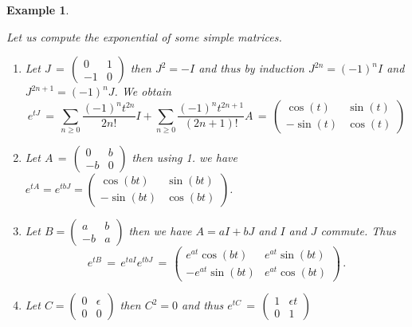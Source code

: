 \documentclass[12pt]{report}
\newtheorem{example}[theorem]{Example}
\begin{document}
\begin{example}\label{exexp}
{\rm Let us compute the exponential of some simple matrices. 

\begin{enumerate}
\item Let $J\,=\, \left( \begin{array}{cc} 0 & 1 \\ -1 & 0 \end{array} \right)$ then $J^2= -I$ and thus by induction $J^{2n}= (-1)^n I$ and $ J^{2n+1} = (-1)^{n} J$. We obtain
\begin{equation}
e^{tJ} \,=\,  \sum_{n\ge 0} \frac{(-1)^n t^{2n} }{2n!} I +  \sum_{n\ge 0} \frac{(-1)^n t^{2n+1} }{(2n+1)!} A \,=\,
\left(  \begin{array}{cc} \cos(t) &   \sin(t) \\ -\sin(t)  & \cos(t) \end{array} \right)
\end{equation}
\item Let $A \,=\, \left( \begin{array}{cc} 0 & b \\ -b & 0 \end{array} \right)$ then using 1. we have 
$e^{tA} = e^{tb J} =  \left(  \begin{array}{cc} \cos(bt) &   \sin(bt) \\ -\sin(bt)  & \cos(bt) \end{array} \right)$. 
\item Let $B= \left( \begin{array}{cc} a & b \\ -b & a \end{array} \right)$  then we have $A= a I +bJ$
and $I$ and $J$ commute. Thus 
\begin{equation}
e^{tB} \,=\, e^{taI} e^{tbJ} \,=\, \left(  \begin{array}{cc} e^{at}\cos(bt) &   e^{at}\sin(bt) \\ -e^{at}\sin(bt)  & e^{at}\cos(bt) \end{array} \right)\,.
\end{equation}
\item  Let  $C = \left( \begin{array}{cc} 0 & \epsilon \\   0 & 0\end{array} \right)$ then $C^2 =0$ and thus
$e^{tC} \,=\, \left( \begin{array}{cc} 1 & \epsilon t \\  0  & 1\end{array} \right)$

\end{enumerate}}
\end{example}
\end{document}
